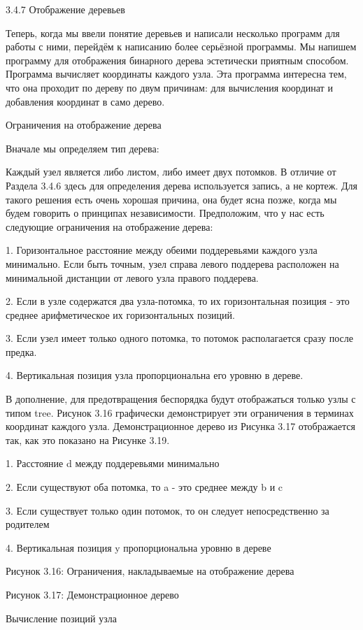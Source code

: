 3.4.7 Отображение деревьев

Теперь, когда мы ввели понятие деревьев и написали несколько программ для работы с ними, перейдём к написанию более серьёзной программы. Мы напишем программу для отображения бинарного дерева эстетически приятным способом. Программа вычисляет координаты каждого узла. Эта программа интересна тем, что она проходит по дереву по двум причинам: для вычисления координат и добавления координат в само дерево.

Ограничения на отображение дерева

Вначале мы определяем тип дерева:

Каждый узел является либо листом, либо имеет двух потомков. В отличие от Раздела 3.4.6 здесь для определения дерева используется запись, а не кортеж. Для такого решения есть очень хорошая причина, она будет ясна позже, когда мы будем говорить о принципах независимости. Предположим, что у нас есть следующие ограничения на отображение дерева:

1. Горизонтальное расстояние между обеими поддеревьями каждого узла минимально. Если быть точным, узел справа левого поддерева расположен на минимальной дистанции от левого узла правого поддерева.

2. Если в узле содержатся два узла-потомка, то их горизонтальная позиция - это среднее арифметическое их горизонтальных позиций.

3. Если узел имеет только одного потомка, то потомок располагается сразу после предка.

4. Вертикальная позиция узла пропорциональна его уровню в дереве.

В дополнение, для предотвращения беспорядка будут отображаться только узлы с типом tree. Рисунок 3.16 графически демонстрирует эти ограничения в терминах координат каждого узла. Демонстрационное дерево из Рисунка 3.17 отображается так, как это показано на Рисунке 3.19.

1. Расстояние d между поддеревьями минимально

2. Если существуют оба потомка, то a - это среднее между b и c

3. Если существует только один потомок, то он следует непосредственно за родителем

4. Вертикальная позиция y пропорциональна уровню в дереве

Рисунок 3.16: Ограничения, накладываемые на отображение дерева

Рисунок 3.17: Демонстрационное дерево

Вычисление позиций узла

